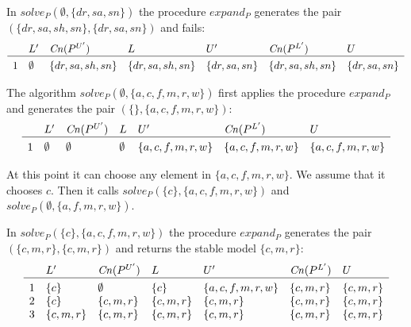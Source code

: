 \begin{Loesung}
{\begin{UList}
In $solve_P(\emptyset,\{dr,sa,sn\})$ 
the procedure $expand_P$ generates the pair
\\$(\{dr,sa,sh,sn\},\{dr,sa,sn\})$ 
and fails:
\[
\begin{array}{c@{\hspace{10pt}}llllll}
& L' & \mathit{Cn}(P^{U'}) & L
& U' & \mathit{Cn}(P^{L'}) & U \\\hline\\[-3mm]
1 & \emptyset & \{dr,sa,sh,sn\} & \{dr,sa,sh,sn\} & \{dr,sa,sn\} & \{dr,sa,sh,sn\} & \{dr,sa,sn\} \\ 
\end{array}
\]

%
\item
The algorithm $solve_P(\emptyset, \{a,c,f,m,r,w\})$
first applies the procedure $expand_P$ and
generates the pair $(\{\}, \{a,c,f,m,r,w\})$:
\[
\begin{array}{c@{\hspace{10pt}}llllll}
& L' & \mathit{Cn}(P^{U'}) & L
& U' & \mathit{Cn}(P^{L'}) & U \\\hline\\[-3mm]
1 & \emptyset & \emptyset & \emptyset & \{a,c,f,m,r,w\} & \{a,c,f,m,r,w\} & \{a,c,f,m,r,w\} \\ 
\end{array}
\]

At this point it can choose any element in $\{a,c,f,m,r,w\}$.
We assume that it chooses $c$.
Then it calls $solve_P(\{c\},\{a,c,f,m,r,w\})$ and $solve_P(\emptyset,\{a,f,m,r,w\})$.

In $solve_P(\{c\},\{a,c,f,m,r,w\})$ 
the procedure $expand_P$ generates the pair
\\
$(\{c,m,r\},\{c,m,r\})$
and returns the stable model $\{c,m,r\}$:
\[
\begin{array}{c@{\hspace{10pt}}llllll}
& L' & \mathit{Cn}(P^{U'}) & L
& U' & \mathit{Cn}(P^{L'}) & U \\\hline\\[-3mm]
1 & \{c\} & \emptyset & \{c\} & \{a,c,f,m,r,w\} & \{c,m,r\} & \{c,m,r\} \\ 
2 & \{c\} & \{c,m,r\} & \{c,m,r\} & \{c,m,r\} & \{c,m,r\} & \{c,m,r\} \\ 
3 & \{c,m,r\} & \{c,m,r\} & \{c,m,r\} & \{c,m,r\} & \{c,m,r\} & \{c,m,r\} \\ 
\end{array}
\]


\end{UList}}
\end{Loesung}
